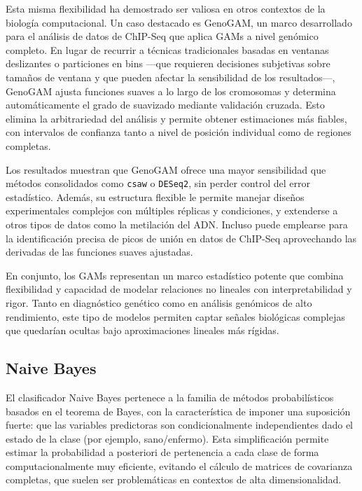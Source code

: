 \documentclass[11pt,a4paper,spanish]{book}
\numberwithin{equation}{chapter}
\numberwithin{figure}{chapter}
\begin{document}
Esta misma flexibilidad ha demostrado ser valiosa en otros contextos de la biología computacional. Un caso destacado es GenoGAM, un marco desarrollado para el análisis de datos de ChIP-Seq que aplica GAMs a nivel genómico completo\cite{10.1093/bioinformatics/btx150}. En lugar de recurrir a técnicas tradicionales basadas en ventanas deslizantes o particiones en bins —que requieren decisiones subjetivas sobre tamaños de ventana y que pueden afectar la sensibilidad de los resultados—, GenoGAM ajusta funciones suaves a lo largo de los cromosomas y determina automáticamente el grado de suavizado mediante validación cruzada. Esto elimina la arbitrariedad del análisis y permite obtener estimaciones más fiables, con intervalos de confianza tanto a nivel de posición individual como de regiones completas.

Los resultados muestran que GenoGAM ofrece una mayor sensibilidad que métodos consolidados como \texttt{csaw} o \texttt{DESeq2}, sin perder control del error estadístico\cite{10.1093/bioinformatics/btx150}. Además, su estructura flexible le permite manejar diseños experimentales complejos con múltiples réplicas y condiciones, y extenderse a otros tipos de datos como la metilación del ADN. Incluso puede emplearse para la identificación precisa de picos de unión en datos de ChIP-Seq aprovechando las derivadas de las funciones suaves ajustadas\cite{10.1093/bioinformatics/btx150}.

En conjunto, los GAMs representan un marco estadístico potente que combina flexibilidad y capacidad de modelar relaciones no lineales con interpretabilidad y rigor. Tanto en diagnóstico genético como en análisis genómicos de alto rendimiento, este tipo de modelos permiten captar señales biológicas complejas que quedarían ocultas bajo aproximaciones lineales más rígidas.\cite{10.1093/bioinformatics/btx150}

\subsection{Naive Bayes}
El clasificador Naive Bayes pertenece a la familia de métodos probabilísticos basados en el teorema de Bayes, con la característica de imponer una suposición fuerte: que las variables predictoras son condicionalmente independientes dado el estado de la clase (por ejemplo, sano/enfermo). Esta simplificación permite estimar la probabilidad a posteriori de pertenencia a cada clase de forma computacionalmente muy eficiente, evitando el cálculo de matrices de covarianza completas, que suelen ser problemáticas en contextos de alta dimensionalidad\cite{rish2001,Libbrecht2015,Maron1961}.
\end{document}
